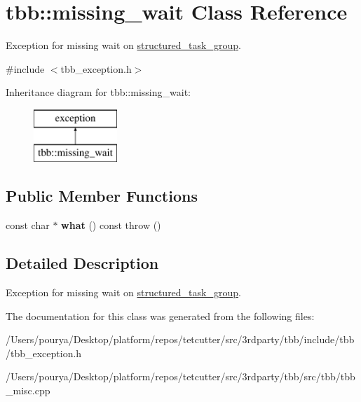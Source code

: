 \hypertarget{classtbb_1_1missing__wait}{}\section{tbb\+:\+:missing\+\_\+wait Class Reference}
\label{classtbb_1_1missing__wait}


Exception for missing wait on \hyperlink{classtbb_1_1structured__task__group}{structured\+\_\+task\+\_\+group}.  




{\ttfamily \#include $<$tbb\+\_\+exception.\+h$>$}

Inheritance diagram for tbb\+:\+:missing\+\_\+wait\+:\begin{figure}[H]
\begin{center}
\leavevmode
\includegraphics[height=2.000000cm]{classtbb_1_1missing__wait}
\end{center}
\end{figure}
\subsection*{Public Member Functions}
\begin{DoxyCompactItemize}
\item 
\hypertarget{classtbb_1_1missing__wait_a04f457174bd4e5ae71c0956bfd7197e0}{}const char $\ast$ {\bfseries what} () const   throw ()\label{classtbb_1_1missing__wait_a04f457174bd4e5ae71c0956bfd7197e0}

\end{DoxyCompactItemize}


\subsection{Detailed Description}
Exception for missing wait on \hyperlink{classtbb_1_1structured__task__group}{structured\+\_\+task\+\_\+group}. 

The documentation for this class was generated from the following files\+:\begin{DoxyCompactItemize}
\item 
/\+Users/pourya/\+Desktop/platform/repos/tetcutter/src/3rdparty/tbb/include/tbb/tbb\+\_\+exception.\+h\item 
/\+Users/pourya/\+Desktop/platform/repos/tetcutter/src/3rdparty/tbb/src/tbb/tbb\+\_\+misc.\+cpp\end{DoxyCompactItemize}
